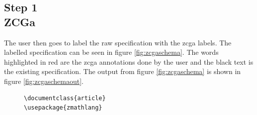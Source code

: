\subsection{Step 1\\ZCGa}

The user then goes to label the raw specification with the \gls{zcga} labels.
The labelled specification can be seen in figure \ref{fig:zcgaschema}. The words
highlighted in {\color{red}red} are the \gls{zcga} annotations done by the user
and the black text is the existing specification. The output from figure \ref{fig:zcgaschema}
is shown in figure \ref{fig:zcgaschemaout}.

\begin{figure}[H]
\centering
\begin{minipage}{0.45\textwidth}
\centering
\begin{tiny}
\begin{BVerbatim}[commandchars=+\[\]]
\documentclass{article}
\usepackage{zmathlang}


\end{BVerbatim}
\end{tiny}
\end{minipage}
\end{figure}
